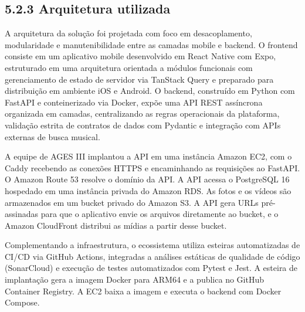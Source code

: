\hypertarget{__RefHeading___Toc4837_3118176633}{}
\subsection*{5.2.3 Arquitetura utilizada}
\label{ages-iv:text-h-0110}

A arquitetura da solução foi projetada com foco em desacoplamento, modularidade e manutenibilidade entre as camadas mobile e backend. O frontend consiste em um aplicativo mobile desenvolvido em React Native\space\cite{ages-iv-react-native} com Expo\space\cite{ages-iv-expo}, estruturado em uma arquitetura orientada a módulos funcionais com gerenciamento de estado de servidor via TanStack Query\space\cite{ages-iv-tanstack-query} e preparado para distribuição em ambiente iOS e Android. O backend, construído em Python\space\cite{ages-iv-python} com FastAPI\space\cite{ages-iv-fastapi} e conteinerizado via Docker\space\cite{ages-iv-docker}, expõe uma API REST assíncrona organizada em camadas, centralizando as regras operacionais da plataforma, validação estrita de contratos de dados com Pydantic\space\cite{ages-iv-pydantic} e integração com APIs externas de busca musical.\par

A equipe de AGES III implantou a API em uma instância Amazon EC2, com o Caddy recebendo as conexões HTTPS e encaminhando as requisições ao FastAPI. O Amazon Route 53 resolve o domínio da API. A API acessa o PostgreSQL 16 hospedado em uma instância privada do Amazon RDS\space\cite{ages-iii-rds}. As fotos e os vídeos são armazenados em um bucket privado do Amazon S3\space\cite{ages-iii-s3}. A API gera URLs pré-assinadas para que o aplicativo envie os arquivos diretamente ao bucket, e o Amazon CloudFront\space\cite{ages-iii-cloudfront} distribui as mídias a partir desse bucket.\par

Complementando a infraestrutura, o ecossistema utiliza esteiras automatizadas de CI/CD via GitHub Actions\space\cite{ages-iv-github-actions}, integradas a análises estáticas de qualidade de código (SonarCloud\space\cite{ages-iv-sonar}) e execução de testes automatizados com Pytest\space\cite{ages-iv-pytest} e Jest\space\cite{ages-iv-jest}. A esteira de implantação gera a imagem Docker para ARM64 e a publica no GitHub Container Registry. A EC2 baixa a imagem e executa o backend com Docker Compose.\par

